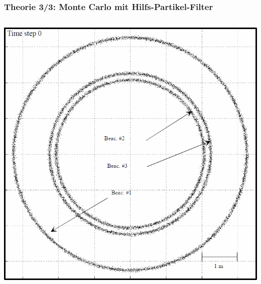 \documentclass{beamer}
\begin{document}
%
%
%
\begin{frame}
	\frametitle{Theorie 3/3:  Monte Carlo mit Hilfs-Partikel-Filter}
	\begin{columns}
			\centering
			\includegraphics[scale=0.4]{blanco2008pure_fig3e}
		

\end{columns}
\end{frame}
\end{document}
